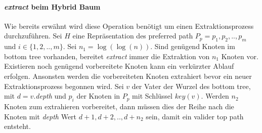 \documentclass[a4paper,12pt]{article}
\begin{document}
\paragraph{\textit{extract} beim Hybrid Baum} 
Wie bereits erwähnt wird diese Operation benötigt um einen Extraktionsprozess durchzuführen. Sei $H$ eine Repräsentation des preferred path $P_p = p_1,p_2,..,p_m$ und $i \in \{1, 2,..,m\}$. Sei $n_1 = \log\left(\log\left(n\right)\right)$. Sind genügend Knoten im bottom tree vorhanden, bereitet \textit{extract} immer die Extraktion von $n_1$ Knoten vor. Existieren noch genügend vorbereitete Knoten kann ein verkürzter Ablauf erfolgen. Ansonsten werden die vorbereiteten Knoten extrahiert bevor ein neuer Extraktionsprozess begonnen wird. Sei $v$ der Vater der Wurzel des bottom tree, mit $d = v.$\textit{depth} und $p_i$ der Knoten in $P_p$ mit Schlüssel $\mathit{key}\left(v\right)$. Werden $n_2$ Knoten zum extrahieren vorbereitet, dann müssen dies der Reihe nach die Knoten mit \textit{depth} Wert $d+1, d+2,..,d + n_2$ sein, damit ein valider top path entsteht. 
\end{document}
